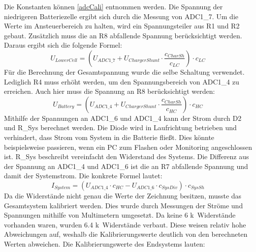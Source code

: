 \documentclass[12pt,a4paper,bibliography=totocnumbered,listof=totocnumbered]{article}
\begin{document}
Die Konstanten können \autoref{adcCali} entnommen werden.
Die Spannung der niedrigeren Batteriezelle ergibt sich durch die Messung von ADC1\_7.
Um die Werte im Ansteuerbereich zu halten, wird ein Spannungsteiler aus R1 und R2 gebaut.
Zusätzlich muss die an R8 abfallende Spannung berücksichtigt werden.
Daraus ergibt sich die folgende Formel:
$$ U_{LowerCell} = (U_{ADC1\_7} + U_{ChargerShunt} \cdot \frac{c_{CharSh}}{c_{LC}}) \cdot c_{LC} $$
Für die Berechnung der Gesamtspannung wurde die selbe Schaltung verwendet.
Lediglich R4 muss erhöht werden, um den Spannungsbereich von ADC1\_4 zu erreichen.
Auch hier muss die Spannung an R8 berücksichtigt werden:
$$ U_{Battery} = (U_{ADC1\_4} + U_{ChargerShunt} \cdot \frac{c_{CharSh}}{c_{HC}}) \cdot c_{HC} $$
Mithilfe der Spannungen an ADC1\_6 und ADC1\_4 kann der Strom durch D2 und R\_Sys berechnet werden.
Die Diode wird in Laufrichtung betrieben und verhindert, dass Strom vom System in die Batterie fließt.
Dies könnte beispielsweise passieren, wenn ein PC zum Flashen oder Monitoring angeschlossen ist.
R\_Sys beschreibt vereinfacht den Widerstand des Systems.
Die Differenz aus der Spannung an ADC1\_4 und ADC1\_6 ist die an R7 abfallende Spannung und damit der Systemstrom.
Die konkrete Formel lautet:
$$ I_{System} = (U_{ADC1\_4} \cdot c_{HC} - U_{ADC1\_6} \cdot c_{SysDiv}) \cdot c_{SysSh} $$
Da die Widerstände nicht genau die Werte der Zeichnung besitzen, musste das Gesamtsystem kalibriert werden.
Dies wurde durch Messungen der Ströme und Spannungen mithilfe von Multimetern umgesetzt.
Da keine 6 k\textOmega \ Widerstände vorhanden waren, wurden 6.4 k\textOmega \ Widerstände verbaut. Diese weisen relativ hohe Abweichungen auf, weshalb die Kalibrierungswerte deutlich von den berechneten Werten abweichen.
Die Kalibrierungswerte des Endsystems lauten:
\end{document}
